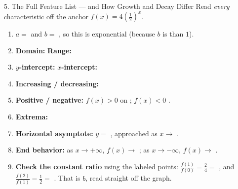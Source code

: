 \documentclass[10pt]{article}
\newcommand{\lgrid}[4]{%
  \draw[step=1, linegray!40, very thin] (#1,#3) grid (#2,#4);
  \draw[->, semithick, charcoal] (#1,0)--(#2,0) node[below right, font=\scriptsize]{$x$};
  \draw[->, semithick, charcoal] (0,#3)--(0,#4) node[left, font=\scriptsize]{$y$};}
\newcommand{\expcurve}[4]{\draw[very thick, forest, domain=#3:#4, samples=120, smooth]
  plot (\x,{#1*exp((#2)*(\x))});}
\begin{document}
\begin{notesbox}{5. The Full Feature List --- and How Growth and Decay Differ}
Read \emph{every} characteristic off the anchor $f(x)=4\left(\frac12\right)^{x}$.
\begin{center}
\end{center}
\begin{enumerate}[leftmargin=1.7em, itemsep=3pt]
  \item $a=$  and $b=$ , so this is exponential 
        (because $b$ is  than $1$).
  \item \textbf{Domain:} \ans{$(-\infty,\infty)$} \quad \textbf{Range:} 
  \item \textbf{$y$-intercept:}  \quad \textbf{$x$-intercept:} 
  \item \textbf{Increasing / decreasing:} 
  \item \textbf{Positive / negative:} $f(x)>0$ on \ans{$(-\infty,\infty)$}; \quad $f(x)<0$
        .
  \item \textbf{Extrema:} 
  \item \textbf{Horizontal asymptote:} $y=$ , approached as $x\to$ \ans{$+\infty$}.
  \item \textbf{End behavior:} as $x\to+\infty$, $f(x)\to$ ; \; as $x\to-\infty$,
        $f(x)\to$ \ans{$+\infty$}.
  \item \textbf{Check the constant ratio} using the labeled points: $\frac{f(1)}{f(0)}=\frac{2}{4}=$
        , and $\frac{f(2)}{f(1)}=\frac{1}{2}=$ . That is $b$, read
        straight off the graph.
\end{enumerate}


\end{notesbox}
\end{document}
